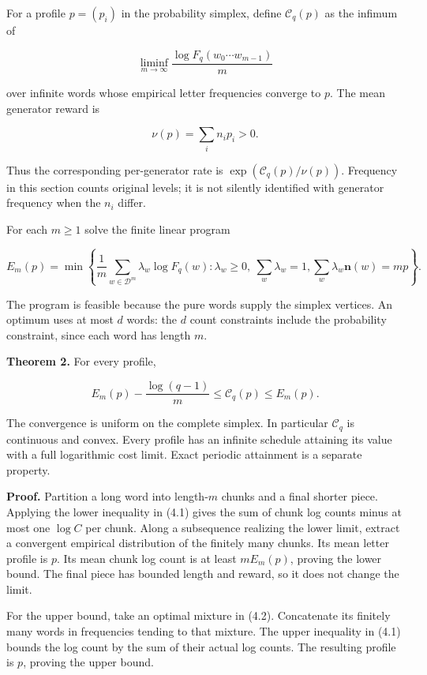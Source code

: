 For a profile \(p=(p_i)\) in the probability simplex, define \(\mathcal C_q(p)\) as the infimum of

\[
\liminf_{m\to\infty}\frac{\log F_q(w_0\cdots w_{m-1})}{m}
\]

over infinite words whose empirical letter frequencies converge to \(p\). The mean generator reward is

\[
\nu(p)=\sum_i n_i p_i>0.
\]

Thus the corresponding per-generator rate is \(\exp(\mathcal C_q(p)/\nu(p))\). Frequency in this section counts original levels; it is not silently identified with generator frequency when the \(n_i\) differ.

For each \(m\ge1\) solve the finite linear program

\[
E_m(p)=\min\left\{
\frac1m\sum_{w\in\mathcal D^m}\lambda_w\log F_q(w):
\lambda_w\ge0,\ \sum_w\lambda_w=1,
\sum_w\lambda_w\mathbf n(w)=mp
\right\}.
\tag{4.2}
\]

The program is feasible because the pure words supply the simplex vertices. An optimum uses at most \(d\) words: the \(d\) count constraints include the probability constraint, since each word has length \(m\).

\textbf{Theorem 2.} For every profile,

\[
\boxed{
E_m(p)-\frac{\log(q-1)}m
\le\mathcal C_q(p)\le E_m(p).
}
\tag{4.3}
\]

The convergence is uniform on the complete simplex. In particular \(\mathcal C_q\) is continuous and convex. Every profile has an infinite schedule attaining its value with a full logarithmic cost limit. Exact periodic attainment is a separate property.

\textbf{Proof.} Partition a long word into length-\(m\) chunks and a final shorter piece. Applying the lower inequality in (4.1) gives the sum of chunk log counts minus at most one \(\log C\) per chunk. Along a subsequence realizing the lower limit, extract a convergent empirical distribution of the finitely many chunks. Its mean letter profile is \(p\). Its mean chunk log count is at least \(mE_m(p)\), proving the lower bound. The final piece has bounded length and reward, so it does not change the limit.

For the upper bound, take an optimal mixture in (4.2). Concatenate its finitely many words in frequencies tending to that mixture. The upper inequality in (4.1) bounds the log count by the sum of their actual log counts. The resulting profile is \(p\), proving the upper bound.

